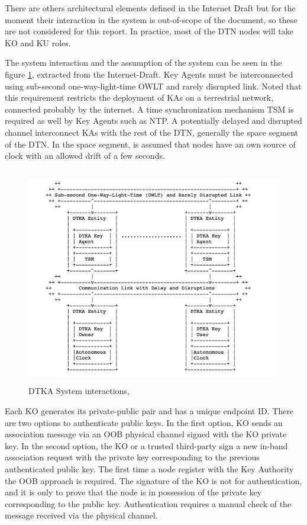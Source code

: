 There are others architectural elements defined in the Internet Draft but for the moment their interaction in the system is out-of-scope of the document, so these are not considered for this report. In practice, most of the DTN nodes will take KO and KU roles.


The system interaction and the assumption of the system can be seen in the figure \ref{fig:dtka}, extracted from the Internet-Draft. Key Agents must be interconnected using sub-second one-way-light-time OWLT and rarely disrupted link. Noted that this requirement restricts the deployment of KAs on a terrestrial network, connected probably by the internet. A time synchronization mechanism TSM is required as well by Key Agents such as NTP. A potentially delayed and disrupted channel interconnect KAs with the rest of the DTN, generally the space segment of the DTN. In the space segment, is assumed that nodes have an own source of clock with an allowed drift of a few seconds.     


\begin{figure}[htb]
\centering
\includegraphics[width=1 \linewidth, height=9.5cm]{images/DTKA.png} 
\caption{DTKA System interactions, \cite{burleigh-dtnwg-dtka-01}}
\label{fig:dtka}
\end{figure}

Each KO generates its private-public pair and has a unique endpoint ID. There are two options to authenticate public keys. In the first option, KO sends an association message via an OOB physical channel signed with the KO private key. In the second option, the KO or a trusted third-party sign a new in-band association request with the private key corresponding to the previous authenticated public key. The first time a node register with the Key Authority the OOB approach is required. The signature of the KO is not for authentication, and it is only to prove that the node is in possession of the private key corresponding to the public key. Authentication requires a manual check of the message received via the physical channel.   




